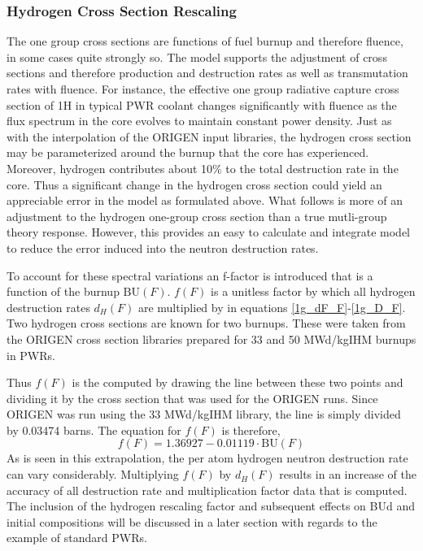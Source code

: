 \subsubsection{Hydrogen Cross Section Rescaling}
\label{1g_sec:H_rescale}
The one group cross sections are functions of fuel burnup and therefore fluence, in some cases quite 
strongly so.  The model supports the adjustment of cross sections  and therefore production 
and destruction rates as well as transmutation rates  with fluence.  For instance, the effective 
one group radiative capture cross section of 1H in typical PWR coolant changes significantly with fluence 
as the flux spectrum in the core evolves to maintain constant power density.  Just as with the interpolation 
of the ORIGEN input libraries, the hydrogen cross section may be parameterized around the burnup that the core 
has experienced.  Moreover, hydrogen contributes about 10\% to the total destruction rate in the core.  
Thus a significant change in the hydrogen cross section could yield an appreciable error in the model as 
formulated above.  What follows is more of an adjustment to the hydrogen one-group cross section than a 
true mutli-group theory response.  However, this provides an easy to calculate and integrate model to 
reduce the error induced into the neutron destruction rates.

To account for these spectral variations an f-factor is introduced that is a function of the burnup 
$\mbox{BU}(F)$.    $f(F)$ is a unitless factor by which all hydrogen destruction rates $d_H(F)$ are 
multiplied by in equations \ref{1g_dF_F}-\ref{1g_D_F}. Two hydrogen cross sections are known for two 
burnups.  These were taken from the ORIGEN cross section libraries prepared for 33 and 50 MWd/kgIHM 
burnups in PWRs.

Thus $f(F)$ is the computed by drawing the line between these two points and dividing it by the cross 
section that was used for the ORIGEN runs.  Since ORIGEN was run using the 33 MWd/kgIHM library, the 
line is simply divided by 0.03474 barns.  The equation for $f(F)$ is therefore, 
\begin{equation}
\label{1g_f_F}
f(F) = 1.36927 - 0.01119 \cdot \mbox{BU}(F)
\end{equation}
As is seen in this extrapolation, the per atom hydrogen neutron destruction rate can vary considerably.  
Multiplying $f(F)$ by $d_H(F)$ results in an increase of the accuracy of all destruction rate and 
multiplication factor data that is computed.  The inclusion of the hydrogen rescaling factor and 
subsequent effects on BUd and initial compositions will be discussed in a later section with regards 
to the example of standard PWRs.  



